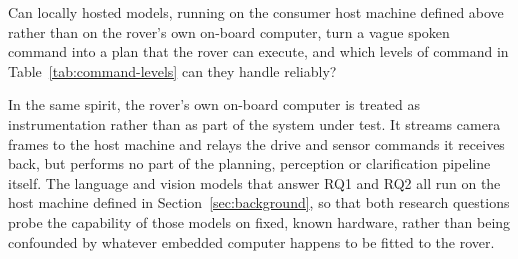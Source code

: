 \item[\textbf{RQ1}] Can locally hosted models, running on the consumer host machine defined
    above rather than on the rover's own on-board computer, turn a vague spoken command into a
    plan that the rover can execute, and which levels of command in Table~\ref{tab:command-levels}
    can they handle reliably?



In the same spirit, the rover's own on-board computer is treated as instrumentation rather than
as part of the system under test. It streams camera frames to the host machine and relays the
drive and sensor commands it receives back, but performs no part of the planning, perception or
clarification pipeline itself. The language and vision models that answer RQ1 and RQ2 all run on
the host machine defined in Section~\ref{sec:background}, so that both research questions probe
the capability of those models on fixed, known hardware, rather than being confounded by whatever
embedded computer happens to be fitted to the rover.

